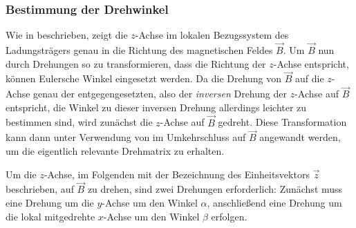 \subsubsection{Bestimmung der Drehwinkel}
\label{sec:drehwinkel}

Wie in  beschrieben, zeigt die \(z\)-Achse im lokalen Bezugssystem des Ladungstr\"agers genau in die
Richtung des magnetischen Feldes \(\vec{B}\). Um \(\vec{B}\) nun durch Drehungen so zu transformieren, dass die Richtung der
\(z\)-Achse entspricht, k\"onnen Eulersche Winkel eingesetzt werden. Da die Drehung von \(\vec{B}\) auf die \(z\)-Achse genau der
entgegengesetzten, also der \textit{inversen} Drehung der \(z\)-Achse auf \(\vec{B}\) entspricht, die Winkel zu dieser inversen
Drehung allerdings leichter zu bestimmen sind, wird zun\"achst die \(z\)-Achse auf \(\vec{B}\) gedreht. Diese Transformation kann
dann unter Verwendung von  im Umkehrschluss auf \(\vec{B}\) angewandt werden, um die eigentlich relevante
Drehmatrix zu erhalten.

Um die \(z\)-Achse, im Folgenden mit der Bezeichnung des Einheitsvektors \(\vec{z}\) beschrieben, auf \(\vec{B}\) zu drehen, sind
zwei Drehungen erforderlich: Zun\"achst muss eine Drehung um die \(y\)-Achse um den Winkel \(\alpha\), anschlie{\ss}end eine Drehung
um die lokal mitgedrehte \(x\)-Achse um den Winkel \(\beta\) erfolgen.

